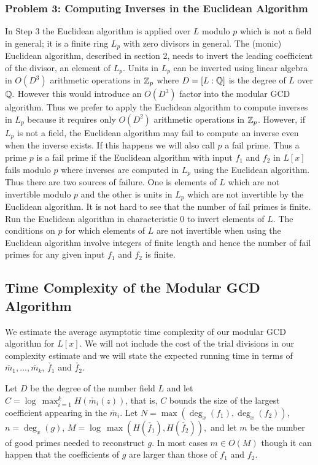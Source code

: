\documentclass[10pt]{article}
\begin{document}
\subsubsection*{Problem 3: Computing Inverses in the Euclidean Algorithm}

In Step 3 the Euclidean algorithm is applied over $L$ modulo $p$ which
is not a field in general; it is a finite ring $L_p$ with zero divisors
in general.  The (monic) Euclidean algorithm, described in section 2,
needs to invert the leading coefficient of the divisor, an element of $L_p$.
Units in $L_p$ can be inverted using linear algebra in $O(D^3)$ arithmetic
operations in ${\mathbb Z}_p$ where $D = [L:{\mathbb Q}]$ is the degree of $L$ over ${\mathbb Q}.$
However this would introduce an $O(D^3)$ factor into the modular GCD algorithm.
Thus we prefer to apply the Euclidean algorithm to compute inverses in $L_p$
because it requires only $O(D^2)$ arithmetic operations in ${\mathbb Z}_p$.
However, if $L_p$ is not a field, the Euclidean algorithm may fail
to compute an inverse even when the inverse exists.
If this happens we will also call $p$ a fail prime.
Thus a prime $p$ is a fail prime if the Euclidean algorithm with
input $f_1$ and $f_2$ in $L[x]$ fails modulo $p$ where inverses
are computed in $L_p$ using the Euclidean algorithm.
Thus there are two sources of failure.  One is elements of $L$ which
are not invertible modulo $p$ and the other is units in $L_p$ which
are not invertible by the Euclidean algorithm.
It is not hard to see that the number of fail primes is finite.
Run the Euclidean algorithm in characteristic 0 to invert
elements of $L.$  The conditions on $p$ for which elements
of $L$ are not invertible when using the Euclidean algorithm
involve integers of finite length and hence the number
of fail primes for any given input $f_1$ and $f_2$ is finite.

\subsection{Time Complexity of the Modular GCD Algorithm}
We estimate the average asymptotic time complexity of our
modular GCD algorithm for $L[x]$.  We will not include the cost
of the trial divisions in our complexity estimate and we
will state the expected running time in terms of
$\check{m_1}, ..., \check{m_k}$, $\check{f_1}$ and $\check{f_2}$.

Let $D$ be the degree of the number field $L$ and let
$C = \log \, \max_{i=1}^k H( \check{m_i}(z) )$, that is, $C$
bounds the size of the largest coefficient appearing in the $\check{m_i}$.
Let $N = \max( \deg_x(f_1), \deg_x(f_2) )$, $n = \deg_x(g)$,
$M = \log \, \max( H(\check{f_1}), H(\check{f_2}) ),$
and let $m$ be the number of good primes needed to reconstruct $g$.
In most cases $m \in O(M)$ though it can happen that the coefficients
of $g$ are larger than those of $f_1$ and $f_2$.
\end{document}
